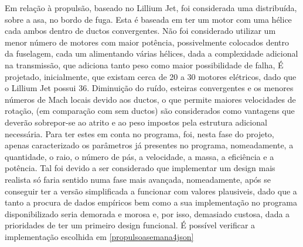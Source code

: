 Em relação à propulsão, baseado no Lillium Jet, foi considerada uma distribuída, sobre a asa, no bordo de fuga. Esta é baseada em ter um motor com uma hélice cada ambos dentro de ductos convergentes. Não foi considerado utilizar um menor número de motores com maior potência, possivelmente colocados dentro da fuselagem, cada um alimentando várias hélices, dada a complexidade adicional na transmissão, que adiciona tanto peso como maior possibilidade de falha, É projetado, inicialmente, que existam cerca de 20 a 30 motores elétricos, dado que o Lillium Jet possui 36\cite{noauthor_2021-sz}. Diminuição do ruído, esteiras convergentes e os menores números de Mach locais devido aos ductos, o que permite maiores velocidades de rotação, (em comparação com sem ductos) são considerados como vantagens que deverão sobrepor-se ao atrito e ao peso impostos pela estrutura adicional necessária. Para ter estes em conta no programa, foi, nesta fase do projeto, apenas caracterizado os parâmetros já presentes no programa, nomeadamente, a quantidade, o raio, o número de pás, a velocidade, a massa, a eficiência e a potência. Tal foi devido a ser considerado que implementar um design mais realista só faria sentido numa fase mais avançada, nomeadamente, após se conseguir ter a versão simplificada a funcionar com valores plausiveis, dado que a tanto a procura de dados empíricos bem como a sua implementação no programa disponibilizado seria demorada e morosa e, por isso, demasiado custosa, dada a prioridades de ter um primeiro design funcional. É possível verificar a implementação escolhida em \ref{propulsoasemana4json}
\FloatBarrier
